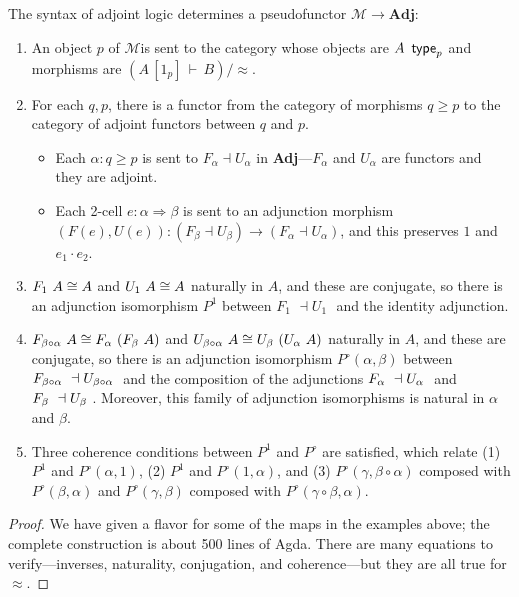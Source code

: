 \documentclass{drl-common/llncs}
\newcommand{\M}{\ensuremath{\mathcal{M}}}
\newcommand{\la}{\ensuremath{\dashv}}
\newcommand{\tc}[2]{\ensuremath{#1 \Rightarrow #2}}
\newcommand{\Adj}{\textbf{Adj}}
\newcommand\compo[2]{\ensuremath{#1 \circ #2}}
\newcommand\compv[2]{\ensuremath{#1 \cdot #2}}
\renewcommand\wftp[2]{\ensuremath{#1 \,\,\, \dsd{type}_{#2}}}
\newcommand\F[2]{\ensuremath{F_{#1} \,\, #2}}
\newcommand\U[2]{\ensuremath{U_{#1} \,\, #2}}
\newcommand\seq[3]{\ensuremath{#1 \, [ #2 ] \, \vdash \, #3}}
\newcommand\ap[2]{\ensuremath{#1 \approx #2}}
\begin{document}
\begin{theorem}
The syntax of adjoint logic determines a pseudofunctor $\M \to \Adj$:
\begin{enumerate}
\item An object $p$ of \M is sent to the category whose objects are
  \wftp{A}{p} and morphisms are $(\seq{A}{1_p}{B})/\ap{}{}$.
\item For each $q,p$, there is a functor from the category of morphisms
  $q \ge p$ to the category of adjoint functors between $q$ and $p$.
  \begin{itemize}
  \item 
  Each $\alpha : q \ge p$ is sent to $F_\alpha \la U_\alpha$ in
  \Adj---$F_\alpha$ and $U_\alpha$ are functors and they are adjoint.

  \item Each 2-cell $e : \tc{\alpha}{\beta}$ is sent to an adjunction
    morphism $(F(e),U(e)) : (F_\beta \la U_\beta) \to (F_\alpha \la
    U_\alpha)$, and this preserves $1$ and $\compv{e_1}{e_2}$.
  \end{itemize}

\item $\F 1 A \iso A$ and $\U 1 A \iso A$ naturally in $A$, and these
  are conjugate, so there is an adjunction isomorphism $P^1$ between $\F 1 {}
  \la \U 1 {}$ and the identity adjunction.

\item $\F {\compo{\beta}{\alpha}} A \iso \F \alpha {(\F \beta A)}$ and
  $\U {\compo{\beta}{\alpha}} A \iso \U \beta {(\U \alpha A)}$ naturally
  in $A$, and these are conjugate, so there is an adjunction isomorphism
  $P^{\circ}(\alpha,\beta)$ between $\F {\compo{\beta}{\alpha}} \la \U
  {\compo{\beta}{\alpha}}$ and the composition of the adjunctions $\F
  {\alpha} \la \U {\alpha}$ and $\F {\beta} \la \U {\beta}$.  Moreover,
  this family of adjunction isomorphisms is natural in $\alpha$ and
  $\beta$.

\item Three coherence conditions between $P^1$ and $P^\circ$ are
  satisfied, which relate (1) $P^1$ and $P^\circ(\alpha,1)$,
  (2) $P^1$ and $P^\circ(1,\alpha)$, and (3) 
  $P^\circ(\gamma,\compo{\beta}{\alpha})$ composed with
  $P^\circ(\beta,\alpha)$ and $P^\circ(\gamma,\beta)$ composed with
  $P^\circ(\compo{\gamma}{\beta},\alpha)$.  
\end{enumerate}
\end{theorem}

\begin{proof}
We have given a flavor for some of the maps in the examples above; the
complete construction is about 500 lines of Agda.  There are many
equations to verify---inverses, naturality, conjugation, and
coherence---but they are all true for \ap{}{}.
\end{proof}
\end{document}
